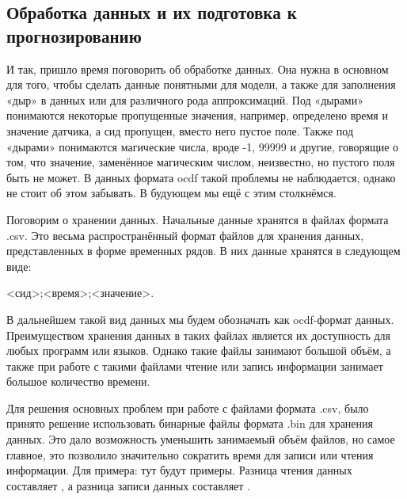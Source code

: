 \titlespace
\subsection*{ 
  \cyrillicfont 
  \fontsize{14pt}{0pt}\selectfont
  \englishfont
   Обработка данных и их подготовка к прогнозированию
} 
\titlespace

{\cyrillicfont 
\fontsize{13pt}{16.25pt}\selectfont 
\englishfont 

  \par \redline И так, пришло время поговорить об обработке данных. Она нужна в основном для того, чтобы сделать данные понятными для модели, а также для заполнения «дыр» в данных или для различного рода аппроксимаций. Под «дырами» понимаются некоторые пропущенные значения, например, определено время и значение датчика, а сид пропущен, вместо него пустое поле. Также под «дырами» понимаются магические числа, вроде -1, 99999 и другие, говорящие о том, что значение, заменённое магическим числом, неизвестно, но пустого поля быть не может. В данных формата ocdf такой проблемы не наблюдается, однако не стоит об этом забывать. В будующем мы ещё с этим столкнёмся.

  \par \redline Поговорим о хранении данных. Начальные данные хранятся в файлах формата .csv. Это весьма распространённый формат файлов для хранения данных, представленных в форме временных рядов. В них данные хранятся в следующем виде: 
  
  \begin{Center}
  <сид>;<время>;<значение>. 
  \end{Center}

  \par \redline В дальнейшем такой вид данных мы будем обозначать как ocdf-формат данных. Преимуществом хранения данных в таких файлах является их доступность для любых программ или языков. Однако такие файлы занимают большой объём, а также при работе с такими файлами чтение или запись информации занимает большое количество времени.  

  \par \redline Для решения основных проблем при работе с файлами формата .csv, было принято решение использовать бинарные файлы формата .bin для хранения данных. Это дало возможность уменьшить занимаемый объём файлов, но самое главное, это позволило значительно сократить время для записи или чтения информации. Для примера: тут будут примеры.   Разница чтения данных составляет , а разница записи данных составляет .

}
